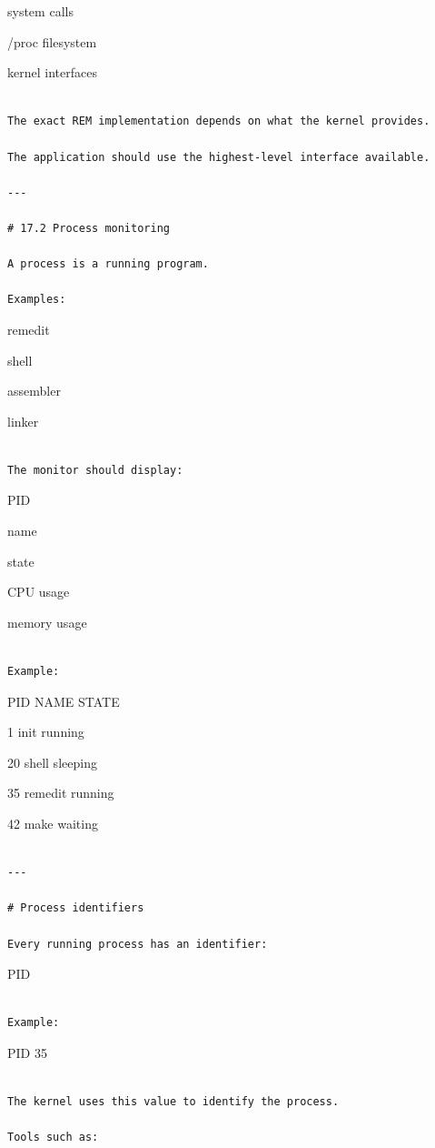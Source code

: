 \documentclass[
  oneside,
  openany]{book}
\begin{document}
system calls

/proc filesystem

kernel interfaces

\begin{verbatim}

The exact REM implementation depends on what the kernel provides.

The application should use the highest-level interface available.

---

# 17.2 Process monitoring

A process is a running program.

Examples:
\end{verbatim}

remedit

shell

assembler

linker

\begin{verbatim}

The monitor should display:
\end{verbatim}

PID

name

state

CPU usage

memory usage

\begin{verbatim}

Example:
\end{verbatim}

PID NAME STATE

1 init running

20 shell sleeping

35 remedit running

42 make waiting

\begin{verbatim}

---

# Process identifiers

Every running process has an identifier:
\end{verbatim}

PID

\begin{verbatim}

Example:
\end{verbatim}

PID 35

\begin{verbatim}

The kernel uses this value to identify the process.

Tools such as:
\end{verbatim}
\end{document}
